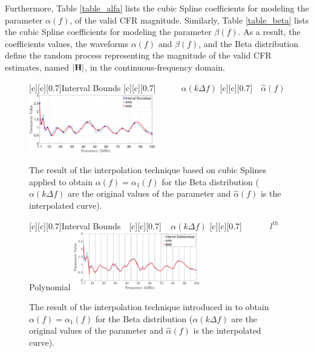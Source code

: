 \documentclass[journal]{IEEEtran}
\begin{document}
Furthermore, Table \ref{table_alfa} lists the cubic Spline coefficients for modeling the parameter $\alpha(f)$, of the valid \ac{CFR} magnitude. Similarly, Table \ref{table_beta} lists the cubic Spline coefficients for modeling the parameter $\beta(f)$. As a result, the coefficients values, the waveforms  $\alpha(f)$ and $\beta(f)$, and the Beta distribution define the random process representing the magnitude of the valid \ac{CFR} estimates, named $|{\bf H}|$, in the continuous-frequency domain.

\begin{figure}[h]
	\centering
	[c][0.7]{Interval Bounds}
	[c][0.7]{~~~~~~$\alpha(k \Delta f)$}
	[c][0.7]{~~$\hat{\alpha}(f)$}
	\includegraphics[width=0.49\textwidth]{images/Alfa_fit_1.7.eps}
	\caption{The result of the interpolation technique based on cubic Splines applied to obtain $\alpha(f) = \alpha_1(f)$ for the Beta distribution ($\alpha(k \Delta f)$ are the original values of the parameter and $\hat{\alpha}(f)$ is the interpolated curve).}
	\label{Fit_alfa}
\end{figure}

\begin{figure}[h]
	\centering
	[c][0.7]{Interval Bounds$~~~$}
	[c][0.7]{$~~~~~{\alpha}(k \Delta f)$}
	[c][0.7]{$~~~~~~~~~~~~~~~l^{th}$ Polynomial}
	\includegraphics[width=0.49\textwidth]{images/SPLINE_Polynomials.eps}
	\caption{The result of the interpolation technique introduced in \cite{Luis:AI} to obtain $\alpha(f)=\alpha_1(f)$ for the Beta distribution (${\alpha}(k \Delta f)$ are the original values of the parameter and $\hat{\alpha}(f)$ is the interpolated curve).}
	\label{Fit_alfa_poli}
\end{figure}
\end{document}

